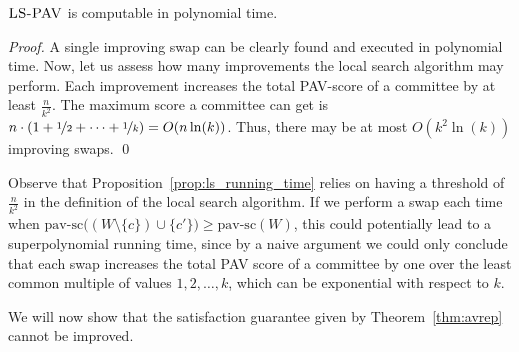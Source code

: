 \documentclass[envcountsame]{llncs}
\newcommand{\ejrls}{{{\textsc{LS-PAV}}}}
\newcommand{\pavscore}{{{\mathrm{pav\text{-}sc}}}}
\begin{document}
\begin{proposition}\label{prop:ls_running_time}
$\ejrls$ is computable in polynomial time.
\end{proposition}
\begin{proof}
A single improving swap can be clearly found and executed in polynomial time. Now, let us assess how many 
improvements the local search algorithm may perform. Each improvement increases the total PAV-score 
of a committee by at least $\frac{n}{k^2}$. 
The maximum score a committee can get is $n\cdot (1+\nicefrac 1 2 +\dots+\nicefrac 1 k)=O(n\ln(k))$. 
Thus, there may be at most $O(k^2\ln(k))$ improving swaps.
\qed\end{proof}

Observe that Proposition~\ref{prop:ls_running_time} relies on
having a threshold of $\frac{n}{k^2}$ in the definition of the local search algorithm. 
If we perform a swap each time when 
$\pavscore\big((W \setminus \{c\}) \cup \{c'\}\big) \geq \pavscore(W)$, 
this could potentially lead to a superpolynomial running time, 
since by a naive argument we could only conclude that each swap 
increases the total PAV score of a committee by one over the least common 
multiple of values $1, 2, \ldots, k$, which can be exponential with respect to $k$.

We will now show that the satisfaction guarantee given by Theorem~\ref{thm:avrep} cannot be improved.
\end{document}
